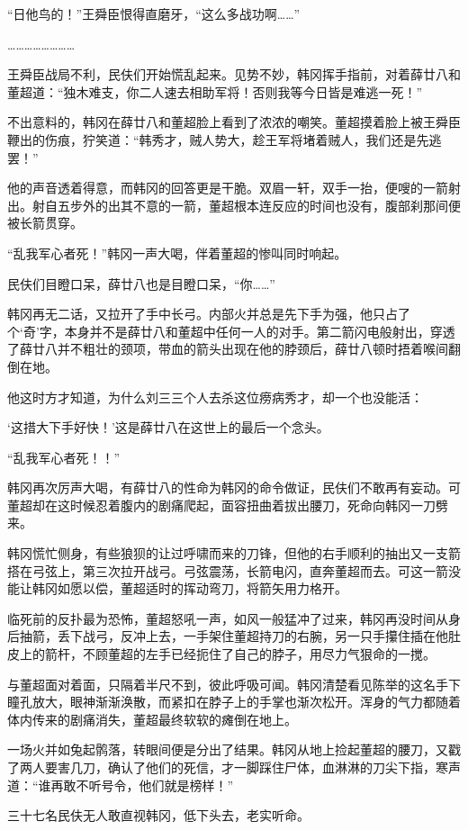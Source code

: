“日他鸟的！”王舜臣恨得直磨牙，“这么多战功啊……”

……………………

王舜臣战局不利，民伕们开始慌乱起来。见势不妙，韩冈挥手指前，对着薛廿八和董超道：“独木难支，你二人速去相助军将！否则我等今日皆是难逃一死！”

不出意料的，韩冈在薛廿八和董超脸上看到了浓浓的嘲笑。董超摸着脸上被王舜臣鞭出的伤痕，狞笑道：“韩秀才，贼人势大，趁王军将堵着贼人，我们还是先逃罢！”

他的声音透着得意，而韩冈的回答更是干脆。双眉一轩，双手一抬，便嗖的一箭射出。射自五步外的出其不意的一箭，董超根本连反应的时间也没有，腹部刹那间便被长箭贯穿。

“乱我军心者死！”韩冈一声大喝，伴着董超的惨叫同时响起。

民伕们目瞪口呆，薛廿八也是目瞪口呆，“你……”

韩冈再无二话，又拉开了手中长弓。内部火并总是先下手为强，他只占了个‘奇’字，本身并不是薛廿八和董超中任何一人的对手。第二箭闪电般射出，穿透了薛廿八并不粗壮的颈项，带血的箭头出现在他的脖颈后，薛廿八顿时捂着喉间翻倒在地。

他这时方才知道，为什么刘三三个人去杀这位痨病秀才，却一个也没能活：

‘这措大下手好快！’这是薛廿八在这世上的最后一个念头。

“乱我军心者死！！”

韩冈再次厉声大喝，有薛廿八的性命为韩冈的命令做证，民伕们不敢再有妄动。可董超却在这时候忍着腹内的剧痛爬起，面容扭曲着拔出腰刀，死命向韩冈一刀劈来。

韩冈慌忙侧身，有些狼狈的让过呼啸而来的刀锋，但他的右手顺利的抽出又一支箭搭在弓弦上，第三次拉开战弓。弓弦震荡，长箭电闪，直奔董超而去。可这一箭没能让韩冈如愿以偿，董超适时的挥动弯刀，将箭矢用力格开。

临死前的反扑最为恐怖，董超怒吼一声，如风一般猛冲了过来，韩冈再没时间从身后抽箭，丢下战弓，反冲上去，一手架住董超持刀的右腕，另一只手攥住插在他肚皮上的箭杆，不顾董超的左手已经扼住了自己的脖子，用尽力气狠命的一搅。

与董超面对着面，只隔着半尺不到，彼此呼吸可闻。韩冈清楚看见陈举的这名手下瞳孔放大，眼神渐渐涣散，而紧扣在脖子上的手掌也渐次松开。浑身的气力都随着体内传来的剧痛消失，董超最终软软的瘫倒在地上。

一场火并如兔起鹘落，转眼间便是分出了结果。韩冈从地上捡起董超的腰刀，又戳了两人要害几刀，确认了他们的死信，才一脚踩住尸体，血淋淋的刀尖下指，寒声道：“谁再敢不听号令，他们就是榜样！”

三十七名民伕无人敢直视韩冈，低下头去，老实听命。


